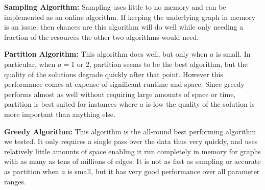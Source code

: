\textbf{Sampling Algorithm:} Sampling uses little to no memory and can
be implemented as an online algorithm. If keeping the underlying graph in
memory is an issue, then chances are this algorithm will do well while only needing
a fraction of the resources the other two algorithms would need. \vs

\textbf{Partition Algorithm:} This algorithm does well, but only when $a$ is small.
In particular, when $a=1$ or 2, partition seems to be the best algorithm, but the quality
of the solutions degrade quickly after that point. However this performance comes at
expense of significant runtime and space. Since greedy performs almost as well without
requiring large amounts of space or time, partition is best suited for instances where
$a$ is low the quality of the solution is more important than anything else. \vs

\textbf{Greedy Algorithm:} This algorithm is the all-round best performing algorithm we tested.
It only requires a single pass over the data thus very quickly,  and uses
relatively little amounts of space enabling it run completely in memory for graphs with
as many as tens of millions of edges. It is not as fast as sampling or accurate as partition
when $a$ is small, but it has very good performance over all parameter ranges. 
